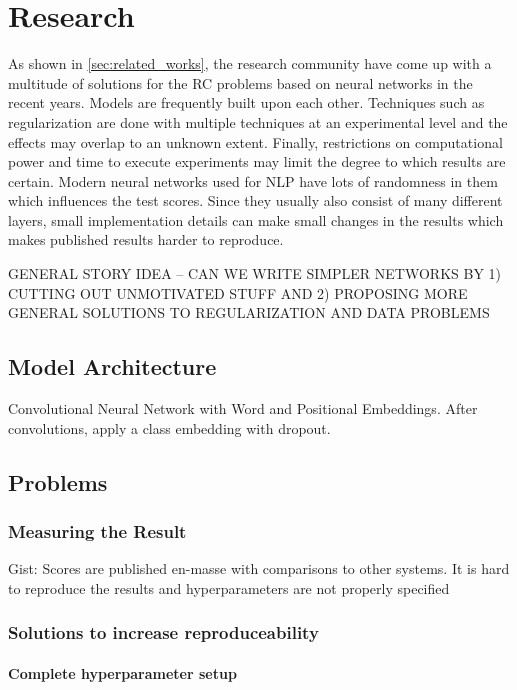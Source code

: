 \chapter{Research}

As shown in \autoref{sec:related_works}, the research community have come up with a multitude of solutions for the RC problems based on neural networks in the recent years. Models are frequently built upon each other. Techniques such as regularization are done with multiple techniques at an experimental level and the effects may overlap to an unknown extent. Finally, restrictions on computational power and time to execute experiments may limit the degree to which results are certain. Modern neural networks used for NLP have lots of randomness in them which influences the test scores. Since they usually also consist of many different layers, small implementation details can make small changes in the results which makes published results harder to reproduce. 

GENERAL STORY IDEA -- CAN WE WRITE SIMPLER NETWORKS BY 1) CUTTING OUT UNMOTIVATED STUFF AND 2) PROPOSING MORE GENERAL SOLUTIONS TO REGULARIZATION AND DATA PROBLEMS  

\section{Model Architecture}

Convolutional Neural Network with Word and Positional Embeddings. After convolutions, apply a class embedding with dropout. 

\section{Problems}

\subsection{Measuring the Result}

Gist: Scores are published en-masse with comparisons to other systems. It is hard to reproduce the results and hyperparameters are not properly specified

\subsection{Solutions to increase reproduceability}

\subsubsection{Complete hyperparameter setup}

